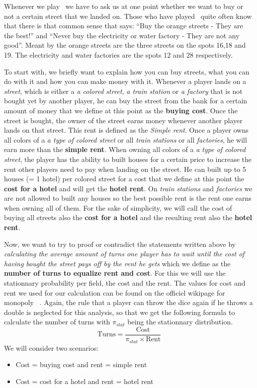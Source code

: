 Whenever we play \monopoly~we have to ask us at one point whether we want to buy or not a certain street 
that we landed on. Those who have played \monopoly~quite often know that there is that common sense that 
says: ``Buy the orange streets - They are the best!'' 
and ``Never buy the electricity or water factory - They are not any good''. 
Meant by the orange streets are the three streets on the spots 16,18 and 19. The electricity and water 
factories are the spots 12 and 28 respectively.

To start with, we briefly want to explain how you can buy streets, what you can do with it and how you can 
make money with it. Whenever a player lands on a \emph{street}, which is either a \emph{a colored street}, 
\emph{a train station} or \emph{a factory} that is not bought yet by another player, he can buy the street 
from the bank for a certain amount of money that we define at this point as the  \textbf{buying cost}.
Once the street is bought, the owner of the street earns money whenever another player lands on that street. 
This rent is defined as the \emph{Simple rent}. 
Once a player owns all colors of a \emph{a type of colored street} or all \emph{train stations} or all 
\emph{factories}, he will earn more than the \textbf{simple rent}. When owning all colors of a \emph{a type 
of colored street}, the player has the ability to built houses for a certain price to increase the rent other 
players need to pay when landing on the street. He can built up to 5 houses (= 1 hotel) per colored street 
for a cost that we define at this point the \textbf{cost for a hotel} and will get the \textbf{hotel rent}.
On \emph{train stations} and \emph{factories} we are not allowed to built any houses so the best possible 
rent is the rent one earns when owning all of them. For the sake of simplicity, we will call the cost of 
buying all streets also the \textbf{cost for a hotel} and the resulting rent also the \textbf{hotel rent}.

Now, we want to try to proof or contradict the statements written above by \emph{calculating the average 
amount of turns one player has to wait until the cost of having bought the street pays off by the rent he 
gets} which we define as the \textbf{number of turns to equalize rent and cost}. For this we will use the stationnary probability per field, the cost and the rent. 
The values for cost and rent we used for our calculation can be found on the officiel wikipage for monopoly 
~\cite{wiki:monopolyRules}. Again, the rule 
that a player can throw the dice again if he throws a double is neglected for this analysis, so that we get 
the following formula to calculate the number of turns with $\pi_{stat}$ being the stationnary distribution.
\[
\text{Turns} = \frac{\text{Cost}}{\pi_{stat} \times \text{Rent}}
\]
We will consider two scenarios:
\begin{itemize}
	\item Cost = buying cost and rent = simple rent
	\item Cost = cost for a hotel and rent = hotel rent
\end{itemize}

